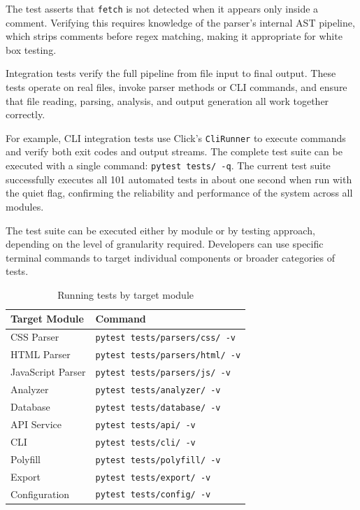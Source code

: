 The test asserts that \texttt{fetch} is not detected when it appears only inside a comment. Verifying this requires knowledge of the parser's internal AST pipeline, which strips comments before regex matching, making it appropriate for white box testing.

Integration tests verify the full pipeline from file input to final output. These tests operate on real files, invoke parser methods or CLI commands, and ensure that file reading, parsing, analysis, and output generation all work together correctly.

For example, CLI integration tests use Click's \texttt{CliRunner} to execute commands and verify both exit codes and output streams. The complete test suite can be executed with a single command: \texttt{pytest tests/ -q}. The current test suite successfully executes all 101 automated tests in about one second when run with the quiet flag, confirming the reliability and performance of the system across all modules.

The test suite can be executed either by module or by testing approach, depending on the level of granularity required. Developers can use specific terminal commands to target individual components or broader categories of tests.

\begin{table}[H]
    \centering
    \begin{tabular}{|l|l|}
        \hline
        \textbf{Target Module} & \textbf{Command} \\
        \hline \hline
        CSS Parser & \texttt{pytest tests/parsers/css/ -v} \\ \hline
        HTML Parser & \texttt{pytest tests/parsers/html/ -v} \\ \hline
        JavaScript Parser & \texttt{pytest tests/parsers/js/ -v} \\ \hline
        Analyzer & \texttt{pytest tests/analyzer/ -v} \\ \hline
        Database & \texttt{pytest tests/database/ -v} \\ \hline
        API Service & \texttt{pytest tests/api/ -v} \\ \hline
        CLI & \texttt{pytest tests/cli/ -v} \\ \hline
        Polyfill & \texttt{pytest tests/polyfill/ -v} \\ \hline
        Export & \texttt{pytest tests/export/ -v} \\ \hline
        Configuration & \texttt{pytest tests/config/ -v} \\ \hline
    \end{tabular}
    \caption{Running tests by target module}
    \label{tab:test-by-module}
\end{table}

